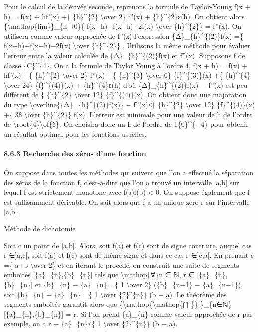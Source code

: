 \documentclass[]{article}
\begin{document}
Pour le calcul de la dérivée seconde, reprenons la formule de
Taylor-Young f(x + h) = f(x) + hf'(x) +\{ \{h\}\^{}\{2\}
\textbackslash{}over 2\} f''(x) + \{h\}\^{}\{2\}ε(h). On obtient alors
\{\textbackslash{}mathop\{lim\}\}\_\{h→0\}\{ f(x+h)+f(x−h)−2f(x)
\textbackslash{}over \{h\}\^{}\{2\}\} = f''(x). On utilisera comme
valeur approchée de f''(x) l'expression \{Δ\}\_\{h\}\^{}\{(2)\}f(x) =\{
f(x+h)+f(x−h)−2f(x) \textbackslash{}over \{h\}\^{}\{2\}\} . Utilisons la
même méthode pour évaluer l'erreur entre la valeur calculée de
\{Δ\}\_\{h\}\^{}\{(2)\}f(x) et f''(x). Supposons f de classe
\{C\}\^{}\{4\}. On a la formule de Taylor Young à l'ordre 4, f(x + h) =
f(x) + hf'(x) +\{ \{h\}\^{}\{2\} \textbackslash{}over 2\} f''(x) +\{
\{h\}\^{}\{3\} \textbackslash{}over 6\} \{f\}\^{}\{(3)\}(x) +\{
\{h\}\^{}\{4\} \textbackslash{}over 24\} \{f\}\^{}\{(4)\}(x) +
\{h\}\^{}\{4\}ε(h) d'où \textbar{}\{Δ\}\_\{h\}\^{}\{(2)\}f(x) −
f''(x)\textbar{} est peu différent de \{ \{h\}\^{}\{2\}
\textbackslash{}over 12\} \textbar{}\{f\}\^{}\{(4)\}(x)\textbar{}. On
obtient donc une majoration du type
\textbar{}\textbackslash{}overline\{\{Δ\}\_\{h\}\^{}\{(2)\}f(x)\} −
f''(x)\textbar{}≤\{ \{h\}\^{}\{2\} \textbackslash{}over 12\}
\textbar{}\{f\}\^{}\{(4)\}(x)\textbar{} +\{ 3δ \textbackslash{}over
\{h\}\^{}\{2\}\} \textbar{}f(x)\textbar{}. L'erreur est minimale pour
une valeur de h de l'ordre de
\textbackslash{}root\{4\}\textbackslash{}of\{δ\}. On choisira donc un h
de l'ordre de 1\{0\}\^{}\{−4\} pour obtenir un résultat optimal pour les
fonctions usuelles.

\paragraph{8.6.3 Recherche des zéros d'une fonction}

On suppose dans toutes les méthodes qui suivent que l'on a effectué la
séparation des zéros de la fonction f, c'est-à-dire que l'on a trouvé un
intervalle {[}a,b{]} sur lequel f est strictement monotone avec f(a)f(b)
\textless{} 0. On suppose également que f est suffisamment dérivable. On
sait alors que f a un unique zéro r sur l'intervalle {[}a,b{]}.

Méthode de dichotomie

Soit c un point de {]}a,b{[}. Alors, soit f(a) et f(c) sont de signe
contraire, auquel cas r ∈{]}a,c{[}, soit f(a) et f(c) sont de même signe
et dans ce cas r ∈{]}c,a{[}. En prenant c =\{ a+b \textbackslash{}over
2\} et en itérant le procédé, on construit une suite de segments
emboîtés {[}\{a\}\_\{n\},\{b\}\_\{n\}{]} tels que
\textbackslash{}mathop\{∀\}n ∈ ℕ, r ∈ {[}\{a\}\_\{n\},\{b\}\_\{n\}{]} et
\{b\}\_\{n\} − \{a\}\_\{n\} =\{ 1 \textbackslash{}over 2\}
(\{b\}\_\{n−1\} − \{a\}\_\{n−1\}), soit \{b\}\_\{n\} − \{a\}\_\{n\} =\{
1 \textbackslash{}over \{2\}\^{}\{n\}\} (b − a). Le théorème des
segments emboîtés garantit alors que
\{\textbackslash{}mathop\{\textbackslash{}mathop\{⋂ \}\}
\}\_\{n∈ℕ\}{[}\{a\}\_\{n\},\{b\}\_\{n\}{]} = r. Si l'on prend
\{a\}\_\{n\} comme valeur approchée de r par exemple, on a \textbar{}r −
\{a\}\_\{n\}\textbar{}≤\{ 1 \textbackslash{}over \{2\}\^{}\{n\}\} (b −
a).
\end{document}
